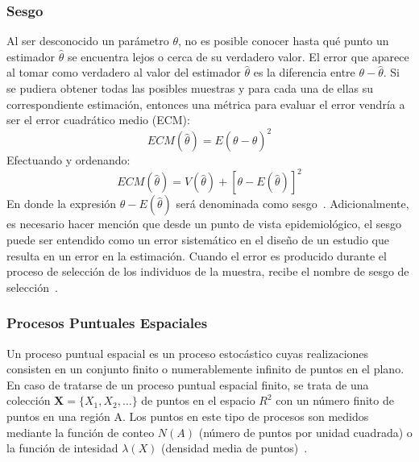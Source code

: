 \subsubsection{Sesgo}
Al ser desconocido un parámetro $\theta$, no es posible conocer hasta qué punto un estimador $\hat{\theta}$ se encuentra lejos o cerca de su verdadero valor. El error que aparece al tomar como verdadero al valor del estimador $\hat{\theta}$ es la diferencia entre $\theta - \hat{\theta}$. Si se pudiera obtener todas las posibles muestras y para cada una de ellas su correspondiente estimación, entonces una métrica para evaluar el error vendría a ser el error cuadrático medio (ECM):
\begin{equation}\label{ECM}
    ECM (\hat{\theta}) = E (\theta - \hat{\theta})^2
\end{equation}
Efectuando y ordenando:
$$ECM (\hat{\theta}) = V( \hat{\theta} ) + [\theta - E (\hat{\theta})]^2$$
En donde la expresión $\theta - E (\hat{\theta})$ será denominada como sesgo~\cite{ruiz2004fundamentos}. Adicionalmente, es necesario hacer mención que desde un punto de vista epidemiológico, el sesgo puede ser entendido como un error sistemático en el diseño de un estudio que resulta en un error en la estimación. Cuando el error es producido durante el proceso de selección de los individuos de la muestra, recibe el nombre de sesgo de selección~\cite{celentano2019gordis}.
\subsubsection{Procesos Puntuales Espaciales}
Un proceso puntual espacial es un proceso estocástico cuyas realizaciones consisten en un conjunto finito o numerablemente infinito de puntos en el plano. En caso de tratarse de un proceso puntual espacial finito, se trata de una colección $\textbf{X}=\{ X_1,X_2,\dots \}$ de puntos en el espacio $R^2$ con un número finito de puntos en una región A. Los puntos en este tipo de procesos son medidos mediante la función de conteo $N(A)$ (número de puntos por unidad cuadrada) o la función de intesidad $\lambda(X)$ (densidad media de puntos)~\cite{baddeley2015spatial}.

